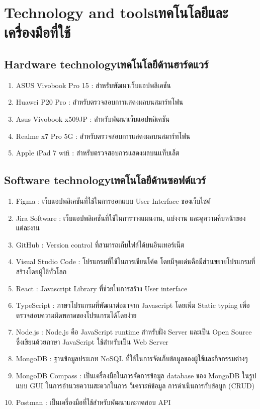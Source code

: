 \section{\ifenglish Technology and tools\else เทคโนโลยีและเครื่องมือที่ใช้\fi}

\subsection{\ifenglish Hardware technology\else เทคโนโลยีด้านฮาร์ดแวร์\fi}
\begin{enumerate}
    \item ASUS Vivobook Pro 15 : สำหรับพัฒนาเว็บแอปพลิเคชัน
    \item Huawei P20 Pro : สำหรับตรวจสอบการแสดงผลบนสมาร์ทโฟน
    \item Asus Vivobook x509JP : สำหรับพัฒนาเว็บแอปพลิเคชัน
    \item Realme x7 Pro 5G : สำหรับตรวจสอบการแสดงผลบนสมาร์ทโฟน
    \item Apple iPad 7 wifi : สำหรับตรวจสอบการแสดงผลบนเเท็บเล็ต
\end{enumerate}
\subsection{\ifenglish Software technology\else เทคโนโลยีด้านซอฟต์แวร์\fi}
\begin{enumerate}
    \item Figma : เว็บแอปพลิเคชันที่ใช้ในการออกแบบ User Interface ของเว็บไซต์
    \item Jira Software : เว็บแอปพลิเคชันที่ใช้ในการวางแผนงาน, แบ่งงาน และดูความคืบหน้าของแต่ละงาน
    \item GitHub : Version control ที่สามารถเก็บไฟล์ได้บนอินเทอร์เน็ต
    \item Visual Studio Code : โปรแกรมที่ใช้ในการเขียนโค้ด โดยมีจุดเด่นคือมีส่วนขยายโปรแกรมที่สร้างโดยผู้ใช้ทั่วโลก
    \item React : Javascript Library ที่ช่วยในการสร้าง User interface
    \item TypeScript : ภาษาโปรแกรมที่พัฒนาต่อมาจาก Javascript โดยเพิ่ม Static typing เพื่อตรวจสอบความผิดพลาดของโปรแกรมได้โดยง่าย
    \item Node.js : Node.js คือ JavaScript runtime สำหรับฝั่ง Server และเป็น Open Source ซึ่งเขียนด้วยภาษา JavaScript ใช้สำหรับเป็น Web Server
    \item MongoDB : ฐานข้อมูลประเภท NoSQL ที่ใช้ในการจัดเก็บข้อมูลของผู้ใช้และกิจกรรมต่างๆ
    \item MongoDB Compass : เป็นเครื่องมือในการจัดการข้อมูล database ของ MongoDB ในรูปแบบ GUI ในการอํานวยความสะดวกในการ วิเคราะห์ข้อมูล การดําเนินการกับข้อมูล (CRUD)
    \item Postman : เป็นเครื่องมือที่ใช้สำหรับพัฒนาและทดสอบ API 
\end{enumerate}
